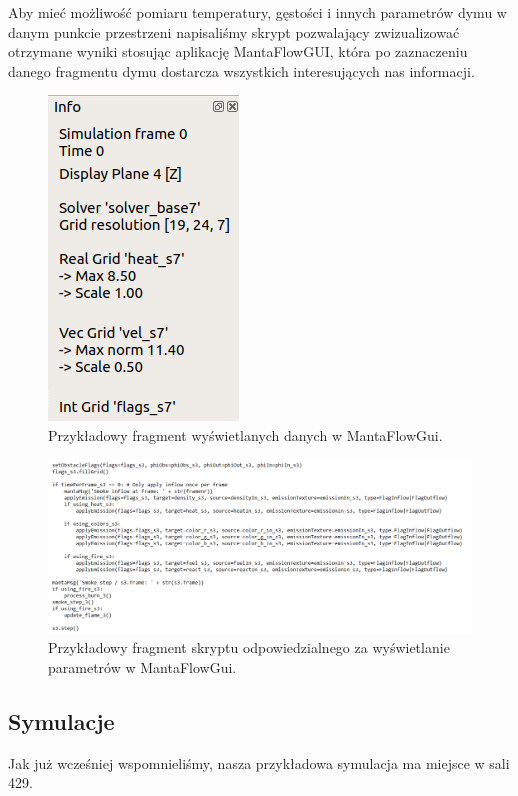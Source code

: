 \documentclass{article}
\begin{document}
            \medskip
            \noindent Aby mieć możliwość pomiaru temperatury, gęstości i innych parametrów dymu w danym punkcie przestrzeni napisaliśmy skrypt pozwalający zwizualizować otrzymane wyniki stosując aplikację MantaFlowGUI, która po zaznaczeniu danego fragmentu dymu dostarcza wszystkich interesujących nas informacji.
            
            
            \begin{figure}[ht!]
                \centering
                \includegraphics[scale = 0.5]{gui_1.png}
                \caption{Przykładowy fragment wyświetlanych danych w MantaFlowGui.}
            \end{figure}
            
            \begin{figure}[ht!]
                \centering
                \includegraphics[scale = 0.5]{skrypt_GUI.png}
                \caption{Przykładowy fragment skryptu odpowiedzialnego za wyświetlanie parametrów w MantaFlowGui.}
            \end{figure}
            
            
        \pagebreak
        \subsection{Symulacje}
        Jak już wcześniej wspomnieliśmy, nasza przykładowa symulacja ma miejsce w sali 429. 
        
\end{document}
